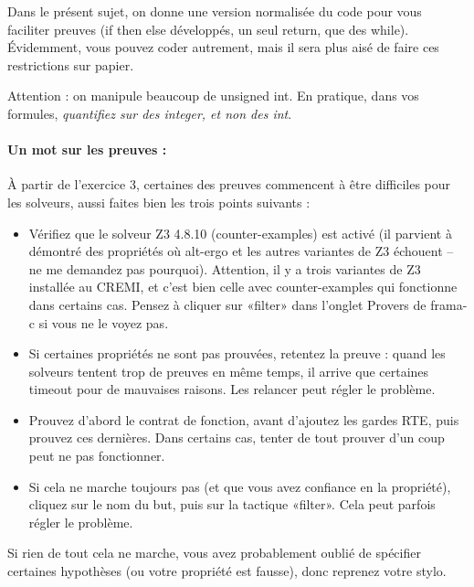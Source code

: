 \documentclass[11pt,answers]{exam}
\begin{document}
Dans le présent sujet, on donne une version normalisée du code pour vous faciliter
preuves (if then else développés, un seul return, que des while). Évidemment, vous pouvez
coder autrement, mais il sera plus aisé de faire ces restrictions sur papier.

Attention : on manipule beaucoup de unsigned int. En pratique, dans vos formules, \emph{quantifiez sur des integer, et non des int}.

\paragraph{Un mot sur les preuves :}

À partir de l’exercice 3, certaines des preuves commencent à être difficiles pour les solveurs, aussi faites bien les trois points suivants :
\begin{itemize}
    \item Vérifiez que le solveur Z3 4.8.10 (counter-examples) est activé (il parvient à démontré des propriétés où alt-ergo et les autres variantes de Z3 échouent -- ne me demandez pas pourquoi). Attention, il y a trois variantes de Z3 installée au CREMI, et c’est bien celle avec counter-examples qui fonctionne dans certains cas. Pensez à cliquer sur «filter» dans l’onglet Provers de frama-c si vous ne le voyez pas.
    \item Si certaines propriétés ne sont pas prouvées, retentez la preuve : quand les solveurs tentent trop de preuves en même temps, il arrive que certaines timeout pour de mauvaises raisons. Les relancer peut régler le problème.
    \item Prouvez d’abord le contrat de fonction, avant d’ajoutez les gardes RTE, puis prouvez ces dernières. Dans certains cas, tenter de tout prouver d’un coup peut ne pas fonctionner.
    \item Si cela ne marche toujours pas (et que vous avez confiance en la propriété), cliquez sur le nom du but, puis sur la tactique «filter». Cela peut parfois régler le problème.
\end{itemize}

Si rien de tout cela ne marche, vous avez probablement oublié de spécifier certaines hypothèses (ou votre propriété est fausse), donc reprenez votre stylo.
\end{document}
